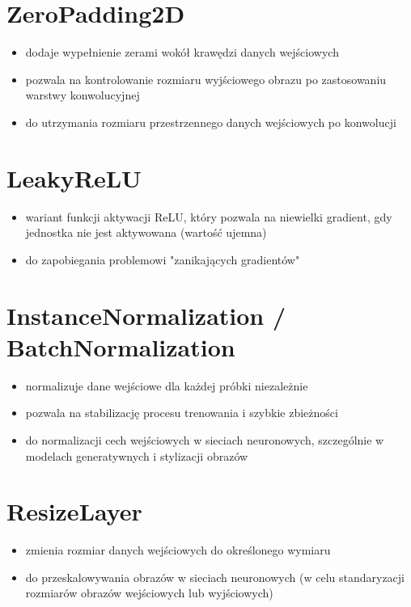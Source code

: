 \documentclass{article}
\begin{document}
\section{ZeroPadding2D}
\begin{itemize}
    \item dodaje wypełnienie zerami wokół krawędzi danych wejściowych
    \item pozwala na kontrolowanie rozmiaru wyjściowego obrazu po zastosowaniu warstwy konwolucyjnej
    \item do utrzymania rozmiaru przestrzennego danych wejściowych po konwolucji
\end{itemize}

\section{LeakyReLU}
\begin{itemize}
    \item wariant funkcji aktywacji ReLU, który pozwala na niewielki gradient, gdy jednostka nie jest aktywowana (wartość ujemna)
    \item do zapobiegania problemowi "zanikających gradientów"
\end{itemize}

\section{InstanceNormalization / BatchNormalization}
\begin{itemize}
    \item normalizuje dane wejściowe dla każdej próbki niezależnie
    \item pozwala na stabilizację procesu trenowania i szybkie zbieżności
    \item do normalizacji cech wejściowych w sieciach neuronowych, szczególnie w modelach generatywnych i stylizacji obrazów
\end{itemize}

\section{ResizeLayer}
\begin{itemize}
    \item zmienia rozmiar danych wejściowych do określonego wymiaru
    \item do przeskalowywania obrazów w sieciach neuronowych (w celu standaryzacji rozmiarów obrazów wejściowych lub wyjściowych)
\end{itemize}
\end{document}

